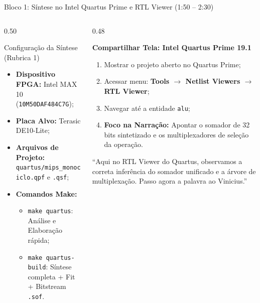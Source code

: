 \documentclass[aspectratio=169, 10pt]{beamer}
\begin{document}
\begin{frame}{Bloco 1: Síntese no Intel Quartus Prime e RTL Viewer (1:50 -- 2:30)}
  \begin{columns}[T]
    \begin{column}{0.50\textwidth}
      \begin{block}{Configuração da Síntese (Rubrica 1)}
        \footnotesize
        \begin{itemize}\setlength{\itemsep}{1pt}
          \item \textbf{Dispositivo FPGA:} Intel MAX 10 (\texttt{10M50DAF484C7G});
          \item \textbf{Placa Alvo:} Terasic DE10-Lite;
          \item \textbf{Arquivos de Projeto:} \texttt{quartus/mips\_monociclo.qpf} e \texttt{.qsf};
          \item \textbf{Comandos Make:}
            \begin{itemize}
              \item \texttt{make quartus}: Análise e Elaboração rápida;
              \item \texttt{make quartus-build}: Síntese completa + Fit + Bitstream \texttt{.sof}.
            \end{itemize}
        \end{itemize}
      \end{block}
    \end{column}

    \begin{column}{0.48\textwidth}
      \begin{tcolorbox}[cuebox]
        \textbf{Compartilhar Tela: Intel Quartus Prime 19.1}
        \vspace{1mm}
        \scriptsize
        \begin{enumerate}\setlength{\itemsep}{1pt}
          \item Mostrar o projeto aberto no Quartus Prime;
          \item Acessar menu: \textbf{Tools $\rightarrow$ Netlist Viewers $\rightarrow$ RTL Viewer};
          \item Navegar até a entidade \texttt{alu};
          \item \textbf{Foco na Narração:} Apontar o somador de 32 bits sintetizado e os multiplexadores de seleção da operação.
        \end{enumerate}
      \end{tcolorbox}

      \begin{tcolorbox}[speakerbox]
        \scriptsize
        ``Aqui no RTL Viewer do Quartus, observamos a correta inferência do somador unificado e a árvore de multiplexação. Passo agora a palavra ao Vinicius.''
      \end{tcolorbox}
    \end{column}
  \end{columns}
\end{frame}
\end{document}

